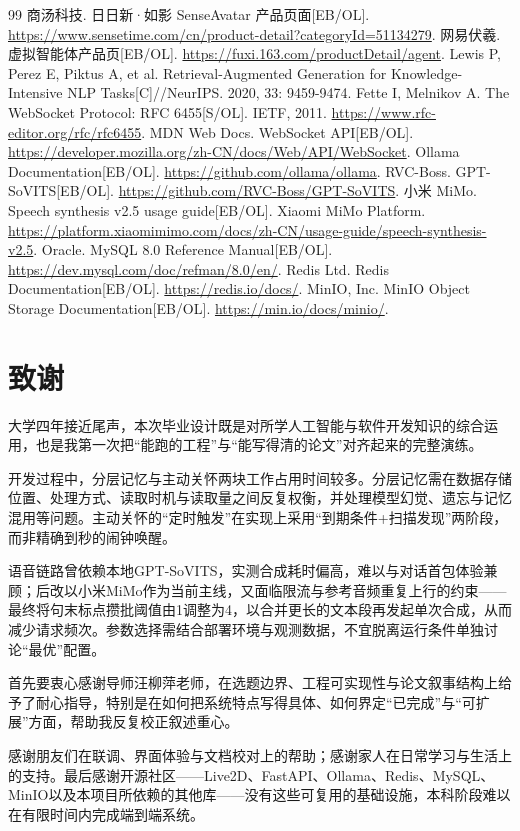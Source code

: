 \documentclass{base}
\begin{document}
\begin{thebibliography}{99}
     商汤科技. 日日新·如影 SenseAvatar 产品页面[EB/OL]. \url{https://www.sensetime.com/cn/product-detail?categoryId=51134279}.
     网易伏羲. 虚拟智能体产品页[EB/OL]. \url{https://fuxi.163.com/productDetail/agent}.
     Lewis P, Perez E, Piktus A, et al. Retrieval-Augmented Generation for Knowledge-Intensive NLP Tasks[C]//NeurIPS. 2020, 33: 9459-9474.
     Fette I, Melnikov A. The WebSocket Protocol: RFC 6455[S/OL]. IETF, 2011. \url{https://www.rfc-editor.org/rfc/rfc6455}.
     MDN Web Docs. WebSocket API[EB/OL]. \url{https://developer.mozilla.org/zh-CN/docs/Web/API/WebSocket}.
     Ollama Documentation[EB/OL]. \url{https://github.com/ollama/ollama}.
     RVC-Boss. GPT-SoVITS[EB/OL]. \url{https://github.com/RVC-Boss/GPT-SoVITS}.
     小米 MiMo. Speech synthesis v2.5 usage guide[EB/OL]. Xiaomi MiMo Platform. \url{https://platform.xiaomimimo.com/docs/zh-CN/usage-guide/speech-synthesis-v2.5}.
     Oracle. MySQL 8.0 Reference Manual[EB/OL]. \url{https://dev.mysql.com/doc/refman/8.0/en/}.
     Redis Ltd. Redis Documentation[EB/OL]. \url{https://redis.io/docs/}.
     MinIO, Inc. MinIO Object Storage Documentation[EB/OL]. \url{https://min.io/docs/minio/}.
\end{thebibliography}

\clearpage
\chapter*{致谢}

大学四年接近尾声，本次毕业设计既是对所学人工智能与软件开发知识的综合运用，也是我第一次把``能跑的工程''与``能写得清的论文''对齐起来的完整演练。

开发过程中，分层记忆与主动关怀两块工作占用时间较多。分层记忆需在数据存储位置、处理方式、读取时机与读取量之间反复权衡，并处理模型幻觉、遗忘与记忆混用等问题。主动关怀的``定时触发''在实现上采用``到期条件+扫描发现''两阶段，而非精确到秒的闹钟唤醒。

语音链路曾依赖本地GPT-SoVITS，实测合成耗时偏高，难以与对话首包体验兼顾；后改以小米MiMo作为当前主线，又面临限流与参考音频重复上行的约束——最终将句末标点攒批阈值由1调整为4，以合并更长的文本段再发起单次合成，从而减少请求频次。参数选择需结合部署环境与观测数据，不宜脱离运行条件单独讨论``最优''配置。

首先要衷心感谢导师汪柳萍老师，在选题边界、工程可实现性与论文叙事结构上给予了耐心指导，特别是在如何把系统特点写得具体、如何界定``已完成''与``可扩展''方面，帮助我反复校正叙述重心。

感谢朋友们在联调、界面体验与文档校对上的帮助；感谢家人在日常学习与生活上的支持。最后感谢开源社区——Live2D、FastAPI、Ollama、Redis、MySQL、MinIO以及本项目所依赖的其他库——没有这些可复用的基础设施，本科阶段难以在有限时间内完成端到端系统。
\end{document}
